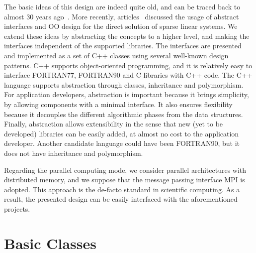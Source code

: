 \documentclass{llncs}
\begin{document}
The basic ideas of this design are indeed quite old, and can be traced back to
almost 30 years ago~\cite{duff79performance,george79design}. More recently,
  articles~\cite{george99object,dobrian99design} discussed the usage of
  abstract interfaces and OO design for the direct solution of sparse linear
  systems.  We extend these ideas by abstracting the concepts to
a higher level, and making the interfaces independent of the
supported libraries. The interfaces are presented and implemented as
a set of C++ classes using several well-known design
patterns. C++ supports object-oriented
programming, and it is relatively easy to interface FORTRAN77,
FORTRAN90 and C libraries with C++ code. The C++ language supports
abstraction through classes, inheritance and polymorphism. For
application developers, abstraction is important because it brings
simplicity, by allowing components with a minimal interface. It also
ensures flexibility because it decouples the different algorithmic
phases from the data structures. Finally, abstraction allows
extensibility in the sense that new (yet to be developed) libraries
can be easily added, at almost no cost to the application developer.
Another candidate language could have been FORTRAN90, but it does
not have inheritance and polymorphism.

Regarding the parallel computing mode, we consider parallel
architectures with distributed memory, and we suppose that the
message passing interface MPI is adopted. This
approach is the de-facto standard in scientific computing. As a result,
the presented design can be easily interfaced with the
aforementioned projects.

\section{Basic Classes}
\label{sec:basic}
\end{document}
